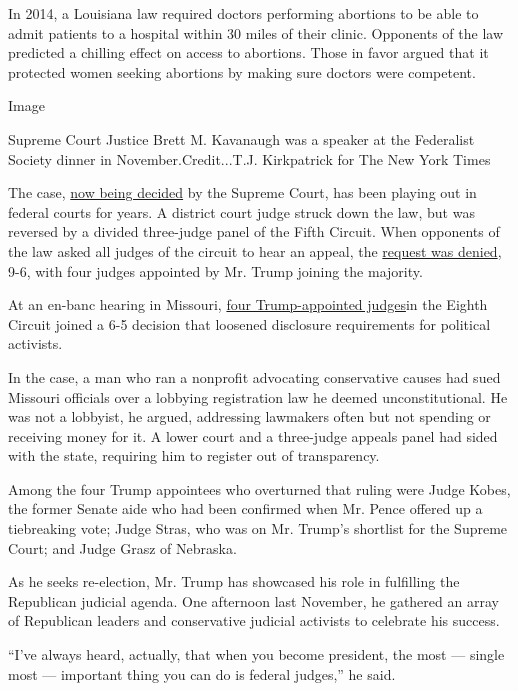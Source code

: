 In 2014, a Louisiana law required doctors performing abortions to be
able to admit patients to a hospital within 30 miles of their clinic.
Opponents of the law predicted a chilling effect on access to abortions.
Those in favor argued that it protected women seeking abortions by
making sure doctors were competent.

Image

Supreme Court Justice Brett M. Kavanaugh was a speaker at the Federalist
Society dinner in November.Credit...T.J. Kirkpatrick for The New York
Times

The case,
\href{https://www.nytimes3xbfgragh.onion/2020/03/04/us/supreme-court-abortion.html}{now
being decided} by the Supreme Court, has been playing out in federal
courts for years. A district court judge struck down the law, but was
reversed by a divided three-judge panel of the Fifth Circuit. When
opponents of the law asked all judges of the circuit to hear an appeal,
the
\href{http://www.ca5.uscourts.gov/opinions/pub/17/17-30397-CV1.pdf}{request
was denied}, 9-6, with four judges appointed by Mr. Trump joining the
majority.

At an en-banc hearing in Missouri,
\href{https://ecf.ca8.uscourts.gov/opndir/19/11/172654P.pdf}{four
Trump-appointed judges}in the Eighth Circuit joined a 6-5 decision that
loosened disclosure requirements for political activists.

In the case, a man who ran a nonprofit advocating conservative causes
had sued Missouri officials over a lobbying registration law he deemed
unconstitutional. He was not a lobbyist, he argued, addressing lawmakers
often but not spending or receiving money for it. A lower court and a
three-judge appeals panel had sided with the state, requiring him to
register out of transparency.

Among the four Trump appointees who overturned that ruling were Judge
Kobes, the former Senate aide who had been confirmed when Mr. Pence
offered up a tiebreaking vote; Judge Stras, who was on Mr. Trump's
shortlist for the Supreme Court; and Judge Grasz of Nebraska.

As he seeks re-election, Mr. Trump has showcased his role in fulfilling
the Republican judicial agenda. One afternoon last November, he gathered
an array of Republican leaders and conservative judicial activists to
celebrate his success.

``I've always heard, actually, that when you become president, the most
--- single most --- important thing you can do is federal judges,'' he
said.

